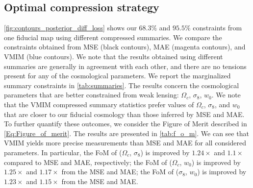 \documentclass{aa}
\begin{document}
\subsection{Optimal compression strategy}
\autoref{fig:contours_posterior_diff_loss} shows our $68.3\%$ and $95.5\%$ constraints from one fiducial map using different compressed summaries.
We compare the constraints obtained from MSE (black contours), MAE (magenta contours), and VMIM (blue contours).
We note that the results obtained using different summaries are generally in agreement with each other, and there are no tensions present for any of the cosmological parameters. We report the marginalized summary constraints in \autoref{tab:summaries}. The results concern the cosmological parameters that are better constrained from weak lensing: $\Omega_c$, $\sigma_8$, $w_0$.
We note that the VMIM compressed summary statistics prefer values of $\Omega_c$, $\sigma_8$, and $w_0$ that are closer to our fiducial cosmology than those inferred by MSE and MAE. \\
To further quantify these outcomes, we consider the Figure of Merit described in \autoref{Eq:Figure_of_merit}. 
The results are presented in \autoref{tab:f_o_m}.
We can see that VMIM yields more precise measurements than MSE and MAE for all considered parameters.
In particular, the FoM of ($\Omega_c$, $\sigma_8$) is improved by $1.24\times$ and $1.1\times$ compared to MSE and MAE, respectively;  the FoM of ($\Omega_c$, $w_0$) is improved by $1.25\times$ and $1.17\times$ from the MSE and MAE; the FoM of ($\sigma_8$, $w_0$) is improved by $1.23\times$ and $1.15\times$ from the MSE and MAE.
\end{document}

